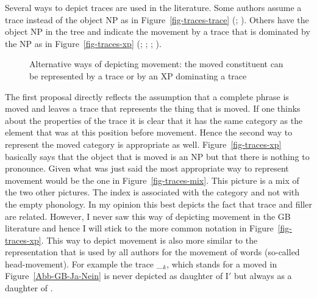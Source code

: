 Several ways to depict traces are used in the literature. Some authors assume a trace instead of
the object NP as in Figure~\ref{fig-traces-trace} (\citealp[, 322]{Grewendorf88a}; \citealp[]{Haegeman94a-u}). Others have the object NP in the tree and indicate the movement by a trace that is
dominated by the NP as in Figure~\ref{fig-traces-xp} (\citealp[]{SS88a};
\citealp[]{Grewendorf88a}; %
\citealp[]{Haegeman94a-u}; \citealp[]{Sternefeld2006a-u}).
\begin{figure}[htbp]
\hfill{}
\hfill
{}
\hfill
{}
\hfill\mbox{}
\caption{Alternative ways of depicting movement: the moved constituent can be represented by a trace
or by an XP dominating a trace}\label{fig-traces}
\end{figure}
The first proposal directly reflects the assumption that a complete phrase is moved and leaves a trace that
represents the thing that is moved. If one thinks about the properties of the trace it is clear that
it has the same category as the element that was at this position before movement. Hence the second
way to represent the moved category is appropriate as well. Figure~\ref{fig-traces-xp} basically says that the object that is moved is an NP but that there is
nothing to pronounce. Given what was just said the most appropriate way to represent
movement would be the one in Figure~\ref{fig-traces-mix}. This picture is a mix of the two other pictures. The index is associated with
the category and not with the empty phonology. In my opinion this best depicts the fact that trace and
filler are related. However, I never saw this way of depicting movement in the GB literature and
hence I will stick to the more common notation in Figure~\ref{fig-traces-xp}. This way to depict
movement is also more similar to the representation that is used by all authors for the movement of
words (so-called head-movement). For example the trace \_$_k$, which stands for a moved \inull in
Figure~\ref{Abb-GB-Ja-Nein} is never depicted as daughter of I$'$ but always as a daughter of \inull.


